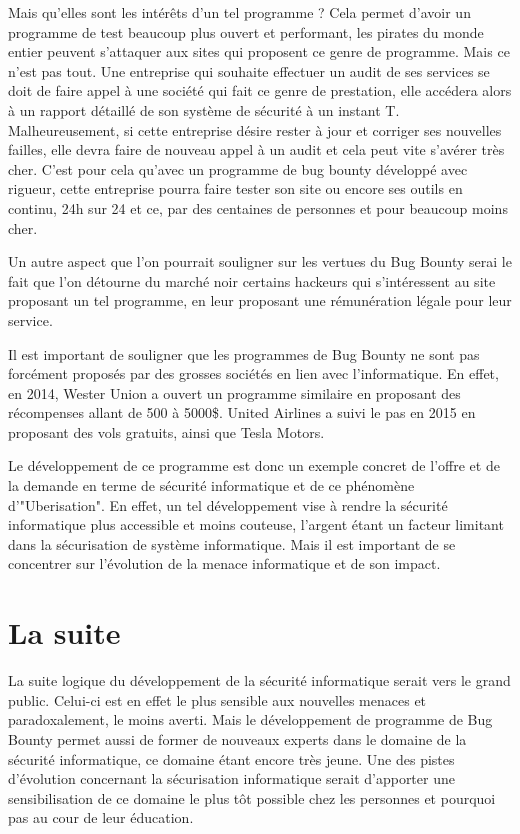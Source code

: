\documentclass[a4paper]{memoir}
\begin{document}
Mais qu'elles sont les intérêts d'un tel programme ?
Cela permet d'avoir un programme de test beaucoup plus ouvert et performant, les pirates du monde entier peuvent s'attaquer aux sites qui proposent ce genre de programme. Mais ce n'est pas tout. 
Une entreprise qui souhaite effectuer un audit de ses services se doit de faire appel à une société qui fait ce genre de prestation, elle accédera alors à un rapport détaillé de son système de sécurité à un instant T. Malheureusement, si cette entreprise désire rester à jour et corriger ses nouvelles failles, elle devra faire de nouveau appel à un audit et cela peut vite s'avérer très cher.
C'est pour cela qu'avec un programme de bug bounty développé avec rigueur, cette entreprise pourra faire tester son site ou encore ses outils en continu, 24h sur 24 et ce, par des centaines de personnes et pour beaucoup moins cher.

Un autre aspect que l'on pourrait souligner sur les vertues du Bug Bounty serai le fait que l'on détourne du marché noir certains hackeurs qui s'intéressent au site proposant un tel programme, en leur proposant une rémunération légale pour leur service.

Il est important de souligner que les programmes de Bug Bounty ne sont pas forcément proposés par des grosses sociétés en lien avec l'informatique. En effet, en 2014, Wester Union a ouvert un programme similaire en proposant des récompenses allant de 500 à 5000\$. United Airlines a suivi le pas en 2015 en proposant des vols gratuits, ainsi que Tesla Motors.

Le développement de ce programme est donc un exemple concret de l'offre et de la demande en terme de sécurité informatique et de ce phénomène d'"Uberisation".
En effet, un tel développement vise à rendre la sécurité informatique plus accessible et moins couteuse, l'argent étant un facteur limitant dans la sécurisation de système informatique.
Mais il est important de se concentrer sur l'évolution de la menace informatique et de son impact.


\chapter{La suite}

La suite logique du développement de la sécurité informatique serait vers le grand public. Celui-ci est en effet le plus sensible aux nouvelles menaces et paradoxalement, le moins averti. 
Mais le développement de programme de Bug Bounty permet aussi de former de nouveaux experts dans le domaine de la sécurité informatique, ce domaine étant encore très jeune.
Une des pistes d'évolution concernant la sécurisation informatique serait d'apporter une sensibilisation de ce domaine le plus tôt possible chez les personnes et pourquoi pas au cour de leur éducation.\\
\end{document}
